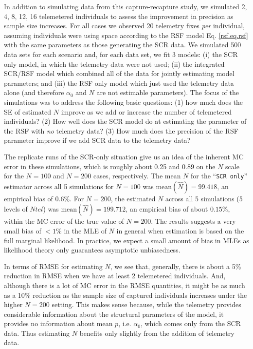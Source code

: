 \documentclass[12pt]{article}
\begin{document}
In addition to simulating data from this capture-recapture study, we
simulated 2, 4, 8, 12, 16 telemetered individuals
 to assess the
improvement in precision as sample size increases.  For all cases we
observed 20 telemetry fixes {\it per} individual, assuming individuals
were using space according to the RSF model
Eq. \ref{rsf.eq.rsf} with the same parameters as those generating the
SCR data. We simulated 500 data sets for each scenario and, for each
data set, we fit 3 models: (i) the SCR only model, in which the
telemetry data were not used; (ii) the integrated SCR/RSF model which
combined all of the data  for jointly estimating model parameters; and
(iii) the RSF only model which just used the telemetry data alone (and
therefore $\alpha_{0}$ and $N$ are not  estimable parameters).
The focus of the simulations was to address the following basic questions:
 (1) how much does
the SE of estimated $N$ improve as we add or increase the number of
telemetered individuals?  (2) How well does the SCR model do at
estimating the parameter of the RSF with {\it no} telemetry data?  (3)
How much does the precision of the RSF parameter improve if we add SCR
data to the telemetry data?


The replicate runs of the SCR-only situation give us an idea of the
inherent MC error in these simulations, which is roughly about
0.25 and 0.89 on the $N$ scale for the $N=100$ and $N=200$ cases, respectively.
 The mean $N$ for the ``\mbox{\tt SCR only}'' estimator
across all 5 simulations for $N=100$ was $\mbox{mean}(\hat{N}) = 99.418$, an empirical bias of
$0.6\%$. For $N=200$, the estimated $N$ across all 5 simulations (5
levels of $Ntel$)  was
$\mbox{mean}(\hat{N}) = 199.712$, an empirical bias of about $0.15\%$, within the MC error of
the true value of $N=200$.
The results suggests a very small bias of $< 1\%$
in the MLE of $N$ in general when estimation is based on the full
marginal likelihood.
  In practice, we expect a
small amount of bias in MLEs as likelihood theory only guarantees
asymptotic unbiasedness.


In terms of RMSE for estimating $N$, we see that, generally, there is about a 5\% reduction
in RMSE when we have at least 2 telemetered individuals. And, although
there is a lot of MC error in the RMSE quantities, it might be as much
as a 10\% reduction as the sample size of captured individuals
increases under the higher $N=200$ setting. This makes sense because, while
the telemetry provides considerable information about the structural
parameters of the model, it provides no information about
mean $p$,
i.e. $\alpha_{0}$, which comes only from the SCR data. Thus
estimating $N$  benefits only slightly from the addition of telemetry
data.
\end{document}
